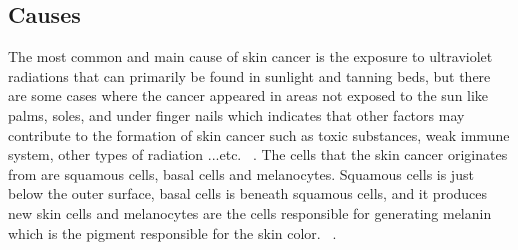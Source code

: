     \subsection{Causes}
        The most common and main cause of skin cancer is the exposure to ultraviolet ~\cite{mayo2020, scf2022, nhs2020} radiations that can primarily be found in sunlight and tanning beds, but there are some cases where the cancer appeared in areas not exposed to the sun like palms, soles, and under finger nails which indicates that other factors may contribute to the formation of skin cancer such as toxic substances, weak immune system, other types of radiation ...etc. ~\cite{mayo2020}.
        The cells that the skin cancer originates from are squamous cells, basal cells and melanocytes. Squamous cells is just below the outer surface, basal cells is beneath squamous cells, and it produces new skin cells and melanocytes are the cells responsible for generating melanin which is the pigment responsible for the skin color. ~\cite{mayo2020}.


